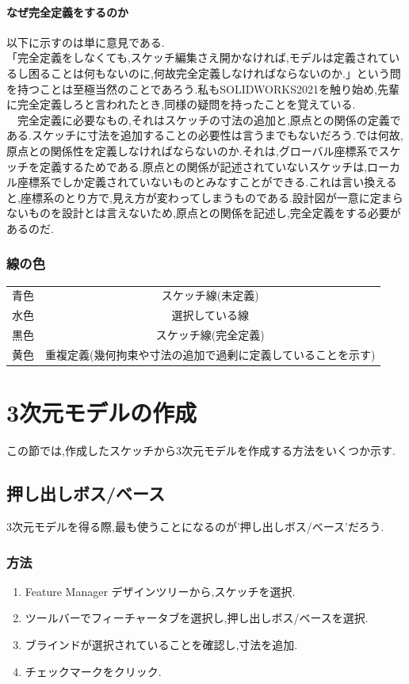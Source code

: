 \documentclass[a4paper,11pt]{jsarticle}
\begin{document}
\paragraph{なぜ完全定義をするのか}
以下に示すのは単に意見である.\\
「完全定義をしなくても,スケッチ編集さえ開かなければ,モデルは定義されているし困ることは何もないのに,何故完全定義しなければならないのか.」という問を持つことは至極当然のことであろう.私もSOLIDWORKS2021を触り始め,先輩に完全定義しろと言われたとき,同様の疑問を持ったことを覚えている.\\
　完全定義に必要なもの,それはスケッチの寸法の追加と,原点との関係の定義である.スケッチに寸法を追加することの必要性は言うまでもないだろう.では何故,原点との関係性を定義しなければならないのか.それは,グローバル座標系でスケッチを定義するためである.原点との関係が記述されていないスケッチは,ローカル座標系でしか定義されていないものとみなすことができる.これは言い換えると,座標系のとり方で,見え方が変わってしまうものである.設計図が一意に定まらないものを設計とは言えないため,原点との関係を記述し,完全定義をする必要があるのだ.
\subsubsection{線の色}
\begin{table}[h]
 \centering
\begin{tabular}[t]{|c|c|}
 青色& スケッチ線(未定義)\\
 水色& 選択している線\\
 黒色& スケッチ線(完全定義)\\
 黄色& 重複定義(幾何拘束や寸法の追加で過剰に定義していることを示す)\\
\end{tabular}
\end{table}
\section{3次元モデルの作成}
この節では,作成したスケッチから3次元モデルを作成する方法をいくつか示す.
\subsection{押し出しボス/ベース}
3次元モデルを得る際,最も使うことになるのが'押し出しボス/ベース'だろう.
\subsubsection{方法}
\begin{enumerate}
 \item Feature Manager デザインツリーから,スケッチを選択.
 \item ツールバーでフィーチャータブを選択し,押し出しボス/ベースを選択.
 \item ブラインドが選択されていることを確認し,寸法を追加.
 \item チェックマークをクリック.
\end{enumerate}
\end{document}
